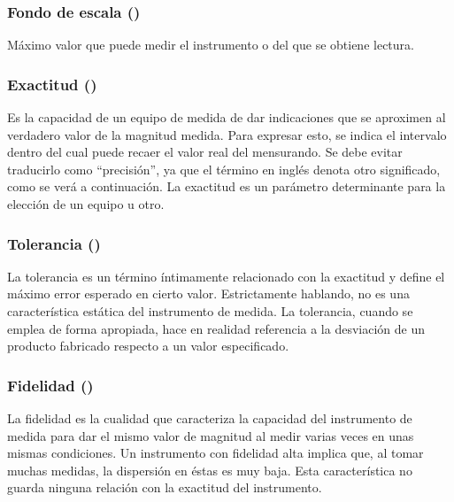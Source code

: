 \subsubsection{Fondo de escala ()}

Máximo valor que puede medir el instrumento o del que se obtiene lectura. 

\subsubsection{Exactitud ()}

Es la capacidad de un equipo de medida de dar indicaciones que se aproximen al verdadero valor de la magnitud medida. Para expresar esto, se indica el intervalo dentro del cual puede recaer el valor real del mensurando. Se debe evitar traducirlo como ``precisión'', ya que el término  en inglés denota otro significado, como se verá a continuación. La exactitud es un parámetro determinante para la elección de un equipo u otro.

\subsubsection{Tolerancia ()}

La tolerancia es un término íntimamente relacionado con la exactitud y define el máximo error esperado en cierto valor. Estrictamente hablando, no es una característica estática del instrumento de medida. La tolerancia, cuando se emplea de forma apropiada, hace en realidad referencia a la desviación de un producto fabricado respecto a un valor especificado.

\subsubsection{Fidelidad ()}

La fidelidad es la cualidad que caracteriza la capacidad del instrumento de medida para dar el mismo valor de magnitud al medir varias veces en unas mismas condiciones. Un instrumento con fidelidad alta implica que, al tomar muchas medidas, la dispersión en éstas es muy baja. Esta característica no guarda ninguna relación con la exactitud del instrumento.

